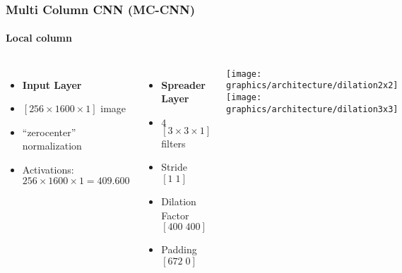 \begin{frame}
    \frametitle{Multi Column CNN (MC-CNN)}
    \framesubtitle{Local column}
    \begin{columns}
            \centering
             {}
             {}
             {}
             {}
             {}
             {}
             {
                \begin{itemize}
                    \item \textbf{Input Layer}
                    \item $\left[256\times 1600\times 1\right]$ image
                    \item ``zerocenter'' normalization
                    \item Activations: $256\times 1600 \times 1 = 409.600$
                \end{itemize}
            }
             {
                \begin{itemize}
                    \item \textbf{Spreader Layer}
                    \item $4$ $\left[3\times 3\times 1\right]$ filters
                    \item Stride $\left[1\;1\right]$
                    \item Dilation Factor $\left[400\;400\right]$
                    \item Padding $\left[672\;0\right]$
                \end{itemize}
            }
             {
                \texttt{[image: graphics/architecture/dilation2x2]}
                \texttt{[image: graphics/architecture/dilation3x3]}
                }
\end{columns}
\end{frame}

